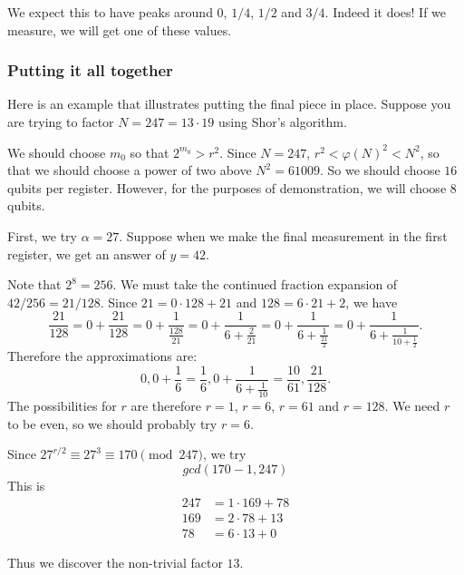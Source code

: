 \documentclass{article}
\theoremstyle{plain}
\theoremstyle{definition}
\theoremstyle{remark}
\numberwithin{theorem}{section}
\begin{document}
     We expect this to have peaks around $0$, $1/4$, $1/2$ and $3/4$.  Indeed it does!  If we measure, we will get one of these values.


 \subsubsection{Putting it all together}

Here is an example that illustrates putting the final piece in place.
Suppose you are trying to factor $N=247= 13 \cdot 19$ using Shor's algorithm.  

We should choose $m_0$ so that $2^{m_0} > r^2$.  Since $N = 247$, $r^2 < \varphi(N)^2 < N^2$, so that we should choose a power of two above $N^2 = 61009$.  So we should choose $16$ qubits per register.  However, for the purposes of demonstration, we will choose $8$ qubits.

First, we try $\alpha = 27$.  Suppose when we make the final measurement in the first register, we get an answer of $y=42$.




	Note that $2^{8} = 256$.
	We must take the continued fraction expansion of $42/256 = 21/128$.  Since $21 = 0 \cdot 128 + 21$ and $128 = 6 \cdot 21 + 2$, we have
	\[
		\frac{21}{128} = 0 + \frac{21}{128} = 0 + \frac{1}{ \frac{128}{21} } = 0 + \frac{1}{ 6 + \frac{2}{21} }  =0 + \frac{1}{ 6 + \frac{1}{ \frac{21}{2} } }
		= 0 + \frac{1}{ 6 + \frac{1}{ 10 + \frac{1}{2}}}.
	\]
	Therefore the approximations are:
	\[
		0, 0 + \frac{1}{6} = \frac{1}{6}, 0 + \frac{1}{ 6 + \frac{1}{10} } = \frac{10}{61}, \frac{21}{128}.
	\]
	The possibilities for $r$ are therefore $r=1$, $r=6$, $r=61$ and $r=128$.  We need $r$ to be even, so we should probably try $r=6$.

	Since $27^{r/2} \equiv 27^3 \equiv 170 \pmod{247}$, we try
	\[
		gcd(170-1,247)
	\]
	This is
	\begin{align*}
		247 &= 1 \cdot 169 + 78 \\
		169 &= 2 \cdot 78 + 13 \\
		78 &= 6 \cdot 13 + 0
	\end{align*}

	Thus we discover the non-trivial factor $13$.
\end{document}
